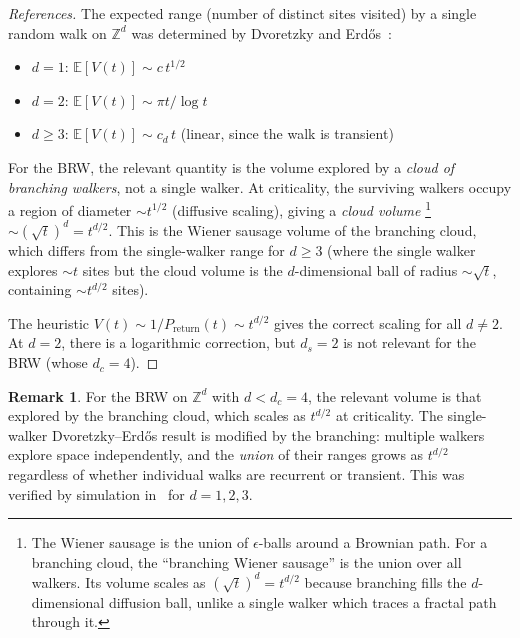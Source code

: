 \documentclass[11pt,a4paper]{article}
\theoremstyle{definition}
\newtheorem*{remark}{Remark}
\newcommand{\Preturn}{P_{\mathrm{return}}}
\begin{document}
\begin{proof}[References]
The expected range (number of distinct sites visited) by a single
random walk on $\mathbb{Z}^d$ was determined by
Dvoretzky and Erd\H{o}s~\cite{dvoretzky1951}:
\begin{itemize}
\item $d = 1$: $\mathbb{E}[V(t)] \sim c\,t^{1/2}$
\item $d = 2$: $\mathbb{E}[V(t)] \sim \pi t / \log t$
\item $d \geq 3$: $\mathbb{E}[V(t)] \sim c_d\, t$ (linear, since the walk is transient)
\end{itemize}

For the BRW, the relevant quantity is the volume explored by a
\emph{cloud of branching walkers}, not a single walker. At criticality,
the surviving walkers occupy a region of diameter $\sim t^{1/2}$
(diffusive scaling), giving a \emph{cloud volume}%
\footnote{The Wiener sausage is the union of $\epsilon$-balls around
a Brownian path. For a branching cloud, the ``branching Wiener sausage''
is the union over all walkers. Its volume scales as $(\sqrt{t})^d = t^{d/2}$
because branching fills the $d$-dimensional diffusion ball, unlike a
single walker which traces a fractal path through it.}
$\sim (\sqrt{t})^d = t^{d/2}$.
This is the Wiener sausage volume of the branching cloud, which
differs from the single-walker range for $d \geq 3$ (where
the single walker explores $\sim t$ sites but the cloud volume
is the $d$-dimensional ball of radius $\sim \sqrt{t}$, containing
$\sim t^{d/2}$ sites).

The heuristic $V(t) \sim 1/\Preturn(t) \sim t^{d/2}$ gives the
correct scaling for all $d \neq 2$. At $d = 2$, there is a logarithmic
correction, but $d_s = 2$ is not relevant for the BRW (whose
$d_c = 4$).
\end{proof}

\begin{remark}
For the BRW on $\mathbb{Z}^d$ with $d < d_c = 4$, the relevant volume
is that explored by the branching cloud, which scales as $t^{d/2}$ at
criticality. The single-walker Dvoretzky--Erd\H{o}s result is modified
by the branching: multiple walkers explore space independently, and the
\emph{union} of their ranges grows as $t^{d/2}$ regardless of whether
individual walks are recurrent or transient. This was verified by
simulation in~\cite{bordeu2019} for $d = 1, 2, 3$.
\end{remark}

\end{document}
